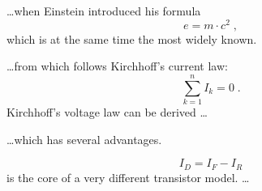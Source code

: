 \documentclass{article}
\begin{document}
\ldots when Einstein introduced his formula
\begin{equation}
	e = m \cdot c^2 \;,
\end{equation}
which is at the same time the most widely known.


\ldots from which follows Kirchhoff's current law:
\begin{equation}
	\sum_{k=1}^{n} I_k = 0 \; .
\end{equation}
Kirchhoff's voltage law can be derived \ldots

\ldots which has several advantages.

\begin{equation}
	I_D = I_F - I_R
\end{equation}
is the core of a very different transistor model. \ldots
\end{document}
